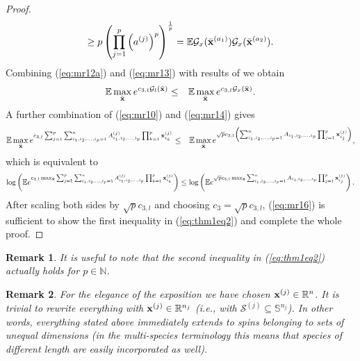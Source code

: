 \documentclass[10pt]{article}
\def\x{{\bf x}}
\def\x{{\mathbf x}}
\def\x{{\bf x}}
\def\x{{\bf x}}
\def\mR{{\mathbb R}}
\def\mN{{\mathbb N}}
\def\mE{{\mathbb E}}
\def\mS{{\mathbb S}}
\def\lp{\left (}
\def\rp{\right )}
\def\x{{\bf x}}
\def\x{{\mathbf x}}
\def\x{{\bf x}}
\def\x{{\bf x}}
\def\cS{{\mathcal S}}
\def\cG{{\mathcal G}}
\newtheorem{remark}{Remark}
\begin{document}
\begin{proof}
\begin{eqnarray}
  \geq  p \lp \prod_{j=1}^p \lp a^{(j) } \rp^p \rp^{\frac{1}{p}} =\mE \cG_x (\bar{\x}^{(a_1)})\cG_x (\bar{\x}^{(a_2)} )  .
  \end{eqnarray}
Combining (\ref{eq:mr12a}) and (\ref{eq:mr13}) with results of \cite{Gordon85}  we obtain
\begin{eqnarray}
\label{eq:mr14}
  \mE  \max_{\bar{\x}} e^{c_{3,l}\cG_l(\bar{\x})} &\leq &   \mE  \max_{\bar{\x}} e^{c_{3,l}\cG_x(\bar{\x})}.
\end{eqnarray}
A further combination of (\ref{eq:mr10}) and (\ref{eq:mr14}) gives
\begin{eqnarray}
\label{eq:mr15}
  \mE \max_{\bar{\x}} e^{c_{3,l}   \sum_{j=1}^p \sum_{i_1,i_2,\dots,i_p=1}^n A^{(j)}_{i_1,i_2,\dots,i_p}\prod_{k=1}^{p}\x_{i_k}^{(j)}   }
  &\leq &
  \mE \max_{\bar{\x}} e^{\sqrt{p} c_{3,l}\lp \sum_{i_1,i_2,\dots,i_p=1}^n A_{i_1,i_2,\dots,i_p}\prod_{j=1}^{p}\x_{i_j}^{(j)}    \rp  } ,
  \end{eqnarray}
which is equivalent to
\begin{equation}
\label{eq:mr16}
\log \lp   \mE  e^{c_{3,l}  \max_{\bar{\x}}  \sum_{j=1}^p \sum_{i_1,i_2,\dots,i_p=1}^n A^{(j)}_{i_1,i_2,\dots,i_p}\prod_{k=1}^{p}\x_{i_k}^{(j)}   } \rp
  \leq
\log \lp  \mE e^{\sqrt{p} c_{3,l}  \max_{\bar{\x}}  \sum_{i_1,i_2,\dots,i_p=1}^n A_{i_1,i_2,\dots,i_p}\prod_{j=1}^{p}\x_{i_j}^{(j)}    }  \rp.
\end{equation}
After scaling both sides by $\sqrt{p}c_{3,l}$ and choosing $c_{3}=\sqrt{p}c_{3,l}$, (\ref{eq:mr16})  is sufficient to show the first inequality in (\ref{eq:thm1eq2}) and complete the whole proof.
 \end{proof}

\begin{remark}
\label{rem:rem1}
  It is useful to note that the second inequality in (\ref{eq:thm1eq2}) actually holds for $p\in\mN$.
\end{remark}

\begin{remark}
\label{rem:rem2}
For the elegance of the exposition we have chosen $\x^{(j)}\in\mR^n$. It is trivial to rewrite everything with $\x^{(j)}\in\mR^{n_j}$ (i.e., with $\cS^{(j)}\subseteq \mS^{n_j}$). In other words, everything stated above immediately extends to spins belonging to sets of unequal dimensions (in the multi-species terminology this means that species of different length are easily incorporated as well).
\end{remark}
\end{document}
